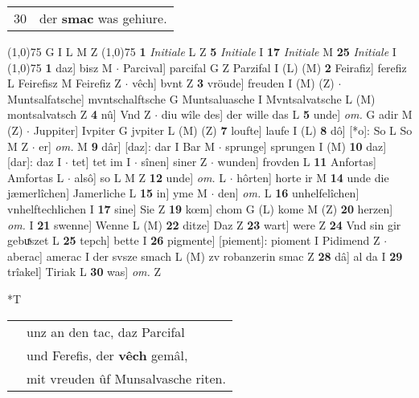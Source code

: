 \documentclass[8pt,a4paper,notitlepage]{article}
\begin{document}
\begin{table}[ht]
\begin{minipage}[t]{0.5\linewidth}
\begin{tabular}{rl}
30 & der \textbf{smac} was gehiure.\\ 
\end{tabular}
\scriptsize
\line(1,0){75} \newline
G I L M Z \newline
\line(1,0){75} \newline
\textbf{1} \textit{Initiale} L Z  \textbf{5} \textit{Initiale} I  \textbf{17} \textit{Initiale} M  \textbf{25} \textit{Initiale} I  \newline
\line(1,0){75} \newline
\textbf{1} daz] bisz M  $\cdot$ Parcival] parcifal G Z Parzifal I (L) (M) \textbf{2} Feirafiz] ferefiz L Feirefisz M Feirefiz Z  $\cdot$ vêch] bvnt Z \textbf{3} vröude] freuden I (M) (Z)  $\cdot$ Muntsalfatsche] mvntschalftsche G Muntsaluasche I Mvntsalvatsche L (M) montsalvatsch Z \textbf{4} nû] Vnd Z  $\cdot$ diu wîle des] der wille das L \textbf{5} unde] \textit{om.} G adir M (Z)  $\cdot$ Juppiter] Ivpiter G jvpiter L (M) (Z) \textbf{7} loufte] laufe I (L) \textbf{8} dô] [*o]: So L So M Z  $\cdot$ er] \textit{om.} M \textbf{9} dâr] [daz]: dar I Bar M  $\cdot$ sprunge] sprungen I (M) \textbf{10} daz] [dar]: daz I  $\cdot$ tet] tet im I  $\cdot$ sînen] siner Z  $\cdot$ wunden] frovden L \textbf{11} Anfortas] Amfortas L  $\cdot$ alsô] so L M Z \textbf{12} unde] \textit{om.} L  $\cdot$ hôrten] horte ir M \textbf{14} unde die jæmerlîchen] Jamerliche L \textbf{15} in] yme M  $\cdot$ den] \textit{om.} L \textbf{16} unhelfelîchen] vnhelftechlichen I \textbf{17} sine] Sie Z \textbf{19} kœm] chom G (L) kome M (Z) \textbf{20} herzen] \textit{om.} I \textbf{21} swenne] Wenne L (M) \textbf{22} ditze] Daz Z \textbf{23} wart] were Z \textbf{24} Vnd sin gir gebuͯszet L \textbf{25} tepch] bette I \textbf{26} pigmente] [piement]: pioment I Pidimend Z  $\cdot$ aberac] amerac I der svsze smach L (M) zv robanzerin smac Z \textbf{28} dâ] al da I \textbf{29} trîakel] Tiriak L \textbf{30} was] \textit{om.} Z \newline
\end{minipage}
\hspace{0.5cm}
\begin{minipage}[t]{0.5\linewidth}
\small
\begin{center}*T
\end{center}
\begin{tabular}{rl}
 & unz an den tac, daz Parcifal\\ 
 & und Ferefis, der \textbf{vêch} gemâl,\\ 
 & mit vreuden ûf Munsalvasche riten.\\ 

\end{tabular}
\end{minipage}
\end{table}
\end{document}
